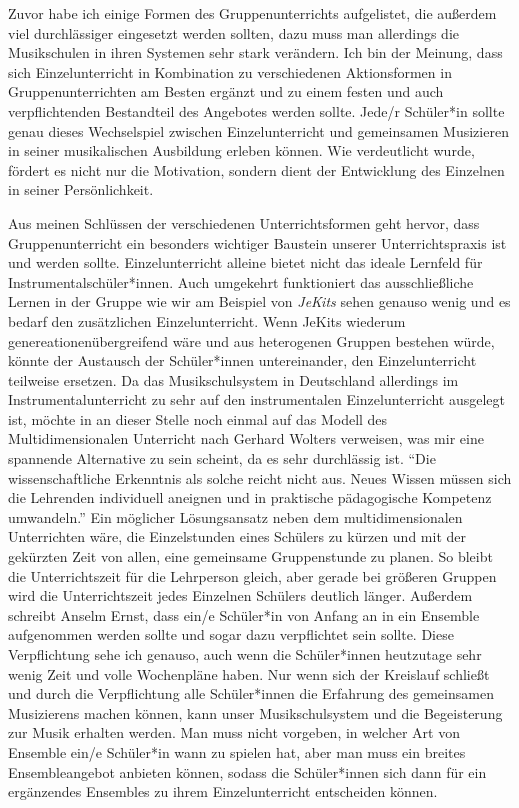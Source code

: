 Zuvor habe ich einige Formen des Gruppenunterrichts aufgelistet, die außerdem
viel durchlässiger eingesetzt werden sollten, dazu muss man allerdings die
Musikschulen in ihren Systemen sehr stark verändern. Ich bin der Meinung, dass
sich Einzelunterricht in Kombination zu verschiedenen Aktionsformen in
Gruppenunterrichten am Besten ergänzt und zu einem festen und auch
verpflichtenden Bestandteil des Angebotes werden sollte. Jede/r Schüler*in
sollte genau dieses Wechselspiel zwischen Einzelunterricht und gemeinsamen
Musizieren in seiner musikalischen Ausbildung erleben können. Wie verdeutlicht
wurde, fördert es nicht nur die Motivation, sondern dient der Entwicklung des
Einzelnen in seiner Persönlichkeit.

Aus meinen Schlüssen der verschiedenen Unterrichtsformen geht hervor, dass
Gruppenunterricht ein besonders wichtiger Baustein unserer Unterrichtspraxis ist
und werden sollte. Einzelunterricht alleine bietet nicht das ideale Lernfeld für
Instrumentalschüler*innen. Auch umgekehrt funktioniert das ausschließliche
Lernen in der Gruppe wie wir am Beispiel von \emph{JeKits} sehen genauso wenig und es
bedarf den zusätzlichen Einzelunterricht. Wenn JeKits wiederum
genereationenübergreifend wäre und aus heterogenen Gruppen bestehen würde,
könnte der Austausch der Schüler*innen untereinander, den Einzelunterricht teilweise
ersetzen. 
Da das Musikschulsystem in Deutschland
allerdings im Instrumentalunterricht zu sehr auf den instrumentalen
Einzelunterricht ausgelegt ist, möchte in an dieser Stelle noch einmal auf das
Modell des Multidimensionalen Unterricht nach Gerhard Wolters verweisen, was mir
eine spannende Alternative zu sein scheint, da es sehr durchlässig ist.
\enquote{Die wissenschaftliche Erkenntnis als solche reicht nicht aus. Neues
Wissen müssen sich die Lehrenden individuell aneignen und in praktische
pädagogische Kompetenz umwandeln.}
\autocite[10]{losert:die_kunst_zu_unterrichten} Ein möglicher Lösungsansatz
neben dem multidimensionalen Unterrichten wäre, die Einzelstunden eines Schülers
zu kürzen und mit der gekürzten Zeit von allen, eine gemeinsame Gruppenstunde zu
planen. So bleibt die Unterrichtszeit für die Lehrperson gleich, aber gerade bei
größeren Gruppen wird die Unterrichtszeit jedes Einzelnen Schülers deutlich
länger.\autocite[33]{losert:die_kunst_zu_unterrichten} Außerdem schreibt Anselm
Ernst, dass ein/e Schüler*in von Anfang an in ein Ensemble aufgenommen
werden sollte und sogar dazu verpflichtet sein sollte.
\autocite[61]{ernst:die_zukunftsfaehige_musikschule} Diese Verpflichtung sehe
ich genauso, auch wenn die Schüler*innen heutzutage sehr wenig Zeit und volle
Wochenpläne haben. Nur wenn sich der Kreislauf schließt und durch die
Verpflichtung alle Schüler*innen die Erfahrung des gemeinsamen Musizierens
machen können, kann unser Musikschulsystem und die Begeisterung zur Musik
erhalten werden. Man muss nicht vorgeben, in welcher Art von Ensemble ein/e
Schüler*in wann zu spielen hat, aber man muss ein breites Ensembleangebot
anbieten können, sodass die Schüler*innen sich dann für ein ergänzendes
Ensembles zu ihrem Einzelunterricht entscheiden können.

